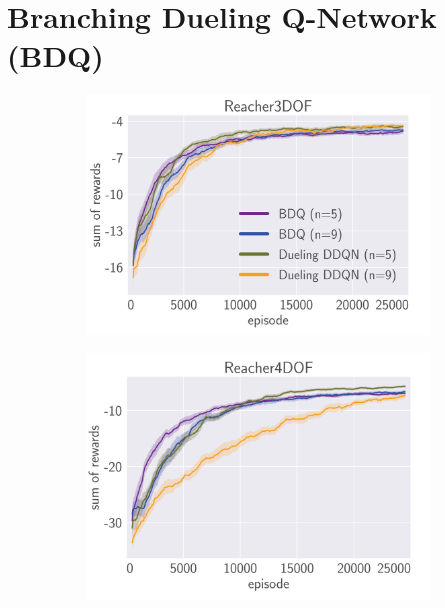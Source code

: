 \section{Branching Dueling Q-Network (BDQ)}

\begin{figure}[htbp] 
    \begin{subfigure}{0.31\textwidth}
      \includegraphics[width=\linewidth]{figures/BDQ1.png}
      \caption{} \label{fig:1a}
    \end{subfigure}%
    \hspace*{\fill}   %
    \begin{subfigure}{0.31\textwidth}
      \includegraphics[width=\linewidth]{figures/BDQ2.png}
      \caption{} \label{fig:1b}
    \end{subfigure}%

\end{figure}
